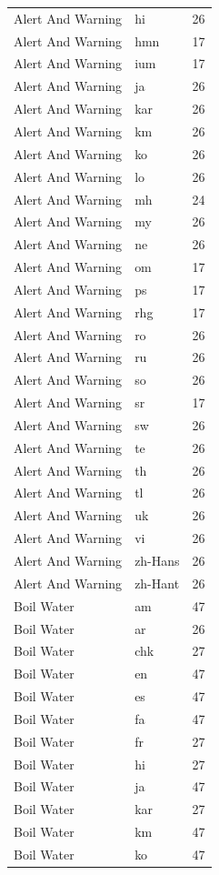 \begin{longtable}{p{3cm} p{3cm} r}
Alert And Warning & hi & 26 \\
Alert And Warning & hmn & 17 \\
Alert And Warning & ium & 17 \\
Alert And Warning & ja & 26 \\
Alert And Warning & kar & 26 \\
Alert And Warning & km & 26 \\
Alert And Warning & ko & 26 \\
Alert And Warning & lo & 26 \\
Alert And Warning & mh & 24 \\
Alert And Warning & my & 26 \\
Alert And Warning & ne & 26 \\
Alert And Warning & om & 17 \\
Alert And Warning & ps & 17 \\
Alert And Warning & rhg & 17 \\
Alert And Warning & ro & 26 \\
Alert And Warning & ru & 26 \\
Alert And Warning & so & 26 \\
Alert And Warning & sr & 17 \\
Alert And Warning & sw & 26 \\
Alert And Warning & te & 26 \\
Alert And Warning & th & 26 \\
Alert And Warning & tl & 26 \\
Alert And Warning & uk & 26 \\
Alert And Warning & vi & 26 \\
Alert And Warning & zh-Hans & 26 \\
Alert And Warning & zh-Hant & 26 \\
Boil Water & am & 47 \\
Boil Water & ar & 26 \\
Boil Water & chk & 27 \\
Boil Water & en & 47 \\
Boil Water & es & 47 \\
Boil Water & fa & 47 \\
Boil Water & fr & 27 \\
Boil Water & hi & 27 \\
Boil Water & ja & 47 \\
Boil Water & kar & 27 \\
Boil Water & km & 47 \\
Boil Water & ko & 47 \\

\end{longtable}
